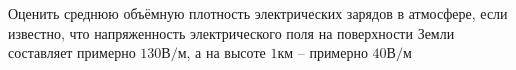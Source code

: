 \documentclass[__main__.tex]{subfiles}
\begin{document}
Оценить среднюю объёмную плотность электрических зарядов в атмосфере, если известно, что напряженность электрического поля на поверхности Земли составляет примерно $130\text{В/м}$, а на высоте $1\text{км}$ -- примерно $40\text{В/м}$\\ 

\end{document}
